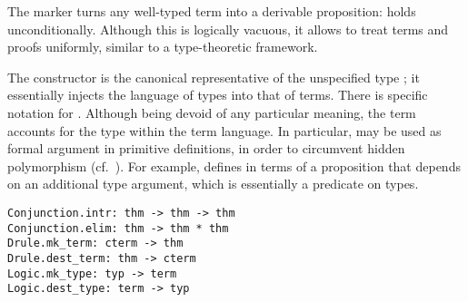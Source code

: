 \begin{isabellebody}
\begin{isamarkuptext}
  The  marker turns any well-typed term into a derivable
  proposition:  holds unconditionally.  Although
  this is logically vacuous, it allows to treat terms and proofs
  uniformly, similar to a type-theoretic framework.

  The  constructor is the canonical representative of
  the unspecified type ; it essentially injects the
  language of types into that of terms.  There is specific notation
   for .
  Although being devoid of any particular meaning, the term  accounts for the type  within the term
  language.  In particular,  may be used as formal
  argument in primitive definitions, in order to circumvent hidden
  polymorphism (cf.\ ).  For example,  defines  in terms of
  a proposition  that depends on an additional type
  argument, which is essentially a predicate on types.%
\end{isamarkuptext}%
\isamarkuptrue%
%
\isadelimmlref
%
\endisadelimmlref
%
\isatagmlref
%
\begin{isamarkuptext}%
\begin{mldecls}
  \verb|Conjunction.intr: thm -> thm -> thm| \\
  \verb|Conjunction.elim: thm -> thm * thm| \\
  \verb|Drule.mk_term: cterm -> thm| \\
  \verb|Drule.dest_term: thm -> cterm| \\
  \verb|Logic.mk_type: typ -> term| \\
  \verb|Logic.dest_type: term -> typ| \\
  \end{mldecls}


\end{isamarkuptext}
\end{isabellebody}
